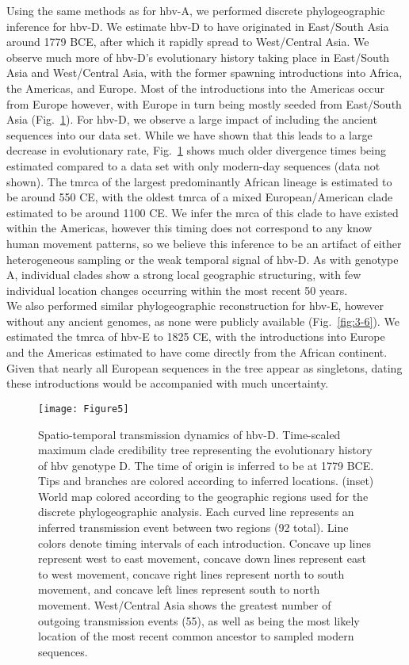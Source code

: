 Using the same methods as for \gls{hbv}-A, we performed discrete phylogeographic inference for \gls{hbv}-D.
We estimate \gls{hbv}-D to have originated in East/South Asia around 1779 BCE, after which it rapidly spread to West/Central Asia.
We observe much more of \gls{hbv}-D's evolutionary history taking place in East/South Asia and West/Central Asia, with the former spawning introductions into Africa, the Americas, and Europe.
Most of the introductions into the Americas occur from Europe however, with Europe in turn being mostly seeded from East/South Asia (Fig.~\ref{fig:3-5}).
For \gls{hbv}-D, we observe a large impact of including the ancient sequences into our data set.
While we have shown that this leads to a large decrease in evolutionary rate, Fig.~\ref{fig:3-5} shows much older divergence times being estimated compared to a data set with only modern-day sequences (data not shown).
The \gls{tmrca} of the largest predominantly African lineage is estimated to be around 550 CE, with the oldest \gls{tmrca} of a mixed European/American clade estimated to be around 1100 CE.
We infer the \gls{mrca} of this clade to have existed within the Americas, however this timing does not correspond to any know human movement patterns, so we believe this inference to be an artifact of either heterogeneous sampling or the weak temporal signal of \gls{hbv}-D.
As with genotype A, individual clades show a strong local geographic structuring, with few individual location changes occurring within the most recent 50 years.\\

We also performed similar phylogeographic reconstruction for \gls{hbv}-E, however without any ancient genomes, as none were publicly available (Fig.~\ref{fig:3-6}).
We estimated the \gls{tmrca} of \gls{hbv}-E to 1825 CE, with the introductions into Europe and the Americas estimated to have come directly from the African continent.
Given that nearly all European sequences in the tree appear as singletons, dating these introductions would be accompanied with much uncertainty.

\begin{figure}[ht]
  \centering
  \texttt{[image: Figure5]}
  \caption[HBV-D phylogeography]{Spatio-temporal transmission dynamics of \gls{hbv}-D. Time-scaled maximum clade credibility tree representing the evolutionary history of \gls{hbv} genotype D. The time of origin is inferred to be at 1779 BCE. Tips and branches are colored according to inferred locations. (inset) World map colored according to the geographic regions used for the discrete phylogeographic analysis. Each curved line represents an inferred transmission event between two regions (92 total). Line colors denote timing intervals of each introduction. Concave up lines represent west to east movement, concave down lines represent east to west movement, concave right lines represent north to south movement, and concave left lines represent south to north movement. West/Central Asia shows the greatest number of outgoing transmission events (55), as well as being the most likely location of the most recent common ancestor to sampled modern sequences.}
  \label{fig:3-5}
\end{figure}

